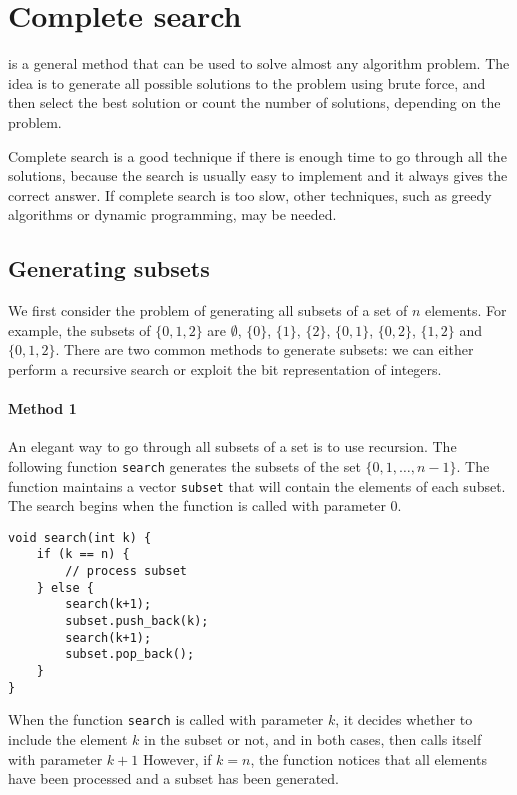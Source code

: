 \chapter{Complete search}

is a general method that can be used
to solve almost any algorithm problem.
The idea is to generate all possible
solutions to the problem using brute force,
and then select the best solution or count the
number of solutions, depending on the problem.

Complete search is a good technique
if there is enough time to go through all the solutions,
because the search is usually easy to implement
and it always gives the correct answer.
If complete search is too slow,
other techniques, such as greedy algorithms or
dynamic programming, may be needed.

\section{Generating subsets}


We first consider the problem of generating
all subsets of a set of $n$ elements.
For example, the subsets of $\{0,1,2\}$ are
$\emptyset$, $\{0\}$, $\{1\}$, $\{2\}$, $\{0,1\}$,
$\{0,2\}$, $\{1,2\}$ and $\{0,1,2\}$.
There are two common methods to generate subsets:
we can either perform a recursive search
or exploit the bit representation of integers.

\subsubsection{Method 1}

An elegant way to go through all subsets
of a set is to use recursion.
The following function \texttt{search}
generates the subsets of the set
$\{0,1,\ldots,n-1\}$.
The function maintains a vector \texttt{subset}
that will contain the elements of each subset.
The search begins when the function is called
with parameter 0.

\begin{lstlisting}
void search(int k) {
    if (k == n) {
        // process subset
    } else {
        search(k+1);
        subset.push_back(k);
        search(k+1);
        subset.pop_back();
    }
}
\end{lstlisting}

When the function \texttt{search}
is called with parameter $k$,
it decides whether to include the
element $k$ in the subset or not,
and in both cases,
then calls itself with parameter $k+1$
However, if $k=n$, the function notices that
all elements have been processed
and a subset has been generated.

